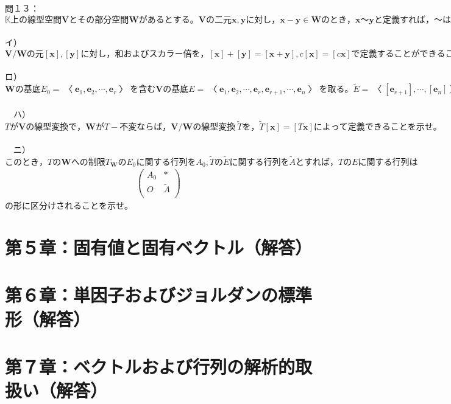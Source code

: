\documentclass[dvipdfmx,uplatex,11pt]{jsarticle}
\begin{document}
%
%
%
\newpage
%
%
%
問１３：$\mathbb{K}上の線型空間\bm{V}とその部分空間\bm{W}があるとする。\bm{V}の二元\bm{x},\bm{y}に対し，\bm{x}-\bm{y} \in \bm{W}のとき，\bm{x}〜\bm{y}と定義すれば，〜は\bm{V}の同値関係である。\bm{V}の〜による商集合を\bm{V}/\bm{W}で表し，\bm{V}の元\bm{x}の含まれる類を[\bm{x}]で表す。$
\\
\\
イ）$\bm{V}/\bm{W}の元[\bm{x}],[\bm{y}]に対し，和およびスカラー倍を，[\bm{x}]+[\bm{y}]=[\bm{x}+\bm{y}],c[\bm{x}]=[c\bm{x}]で定義することができること（すなわち，類の代表の取り方によらないこと）を示し，この演算によって\bm{V}/\bm{W}が\mathbb{K}上の線型空間になることを示せ。\bm{V}/\bm{W}を\bm{V}の\bm{W}による\textbf{商空間}と言う。$\\
\\
ロ）$\bm{W}の基底E_0 =〈\bm{e}_1 ,\bm{e}_2 ,\cdots ,\bm{e}_r 〉を含む\bm{V}の基底E=〈\bm{e}_1 ,\bm{e}_2 ,\cdots ,\bm{e}_r ,\bm{e}_{r+1} ,\cdots ,\bm{e}_n〉を取る。\widetilde{E}=〈[\bm{e}_{r+1}] , \cdots ,[\bm{e}_n]〉は\bm{V}/\bm{W}の基底であることを示せ。（したがって\dim \bm{V}/\bm{W}=\dim \bm{V}-\dim \bm{W}が成り立つ。）$\\
\\
　ハ）$Tが\bm{V}の線型変換で，\bm{W}がT-不変ならば，\bm{V}/\bm{W}の線型変換~\widetilde{T}を，\widetilde{T}[\bm{x}]=[T\bm{x}]によって定義できることを示せ。$\\
\\
　ニ）$このとき，Tの\bm{W}への制限T_{\bm{W}}のE_0に関する行列をA_0, \widetilde{T} の\widetilde{E}に関する行列を\widetilde{A}とすれば，TのEに関する行列は$
\begin{eqnarray*}
\begin{pmatrix}
A_0 & * \\
O & \widetilde{A} \\
\end{pmatrix}
\end{eqnarray*}
の形に区分けされることを示せ。















%
%
%
\newpage
%
%
%
\section{第５章：固有値と固有ベクトル（解答）}
%
%
%
\newpage
%
%
%
\section{第６章：単因子およびジョルダンの標準形（解答）}
%
%
%
\newpage
%
%
%
\section{第７章：ベクトルおよび行列の解析的取扱い（解答）}
\end{document}
